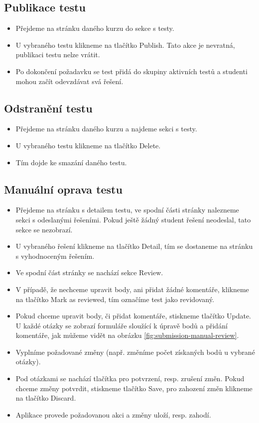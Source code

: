 \subsection{Publikace testu}
\begin{itemize}
	\item Přejdeme na stránku daného kurzu do sekce s testy.
	\item U vybraného testu klikneme na tlačítko Publish. Tato akce je nevratná, publikaci testu nelze vrátit.
	\item Po dokončení požadavku se test přidá do skupiny aktivních testů a studenti mohou začít odevzdávat svá řešení.
\end{itemize}

\subsection{Odstranění testu}
\begin{itemize}
	\item Přejdeme na stránku daného kurzu a najdeme sekci s testy.
	\item U vybraného testu klikneme na tlačítko Delete.
	\item Tím dojde ke smazání daného testu.
\end{itemize}

\subsection{Manuální oprava testu}
\begin{itemize}
	\item Přejdeme na stránku s detailem testu, ve spodní části stránky nalezneme sekci s odeslanými řešeními. Pokud ještě žádný student řešení neodeslal, tato sekce se nezobrazí.
	\item U vybraného řešení klikneme na tlačítko Detail, tím se dostaneme na stránku s vyhodnoceným řešením.
	\item Ve spodní část stránky se nachází sekce Review.
	\item V případě, že nechceme upravit body, ani přidat žádné komentáře, klikneme na tlačítko Mark as reviewed, tím označíme test jako revidovaný.
	\item Pokud chceme upravit body, či přidat komentáře, stiskneme tlačítko Update. U každé otázky se zobrazí formuláře sloužící k úpravě bodů a přidání komentáře, jak můžeme vidět na obrázku \ref{fig:submission-manual-review}.
	\item Vyplníme požadované změny (např. změníme počet získaných bodů u vybrané otázky).
	\item Pod otázkami se nachází tlačítka pro potvrzení, resp. zrušení změn. Pokud chceme změny potvrdit, stiskneme tlačítko Save, pro zahození změn klikneme na tlačítko Discard.
	\item Aplikace provede požadovanou akci a změny uloží, resp. zahodí.
\end{itemize}

